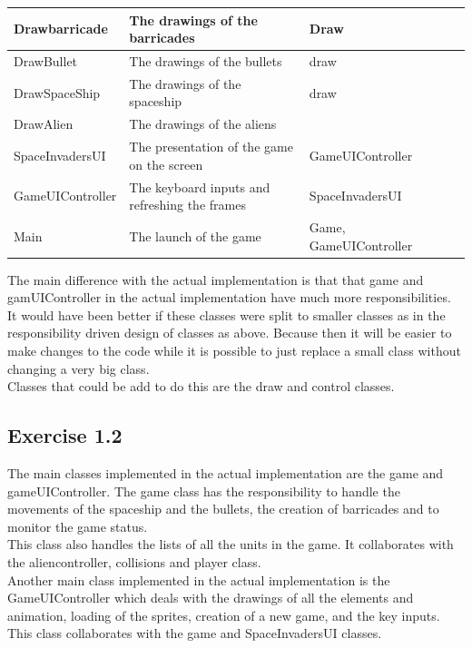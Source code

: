 \documentclass[10pt]{article}
\begin{document}
\begin{center}
\begin{tabular}{ | p{3cm} | p{5cm} | p{3cm} | p{2cm} | p{2cm} |}
  Drawbarricade & The drawings of the barricades & Draw & &  \\  \hline
  DrawBullet & The drawings of the bullets & draw & &  \\  \hline
  DrawSpaceShip & The drawings of the spaceship & draw & &  \\  \hline
  DrawAlien  & The drawings of the aliens & & &  \\  \hline
  SpaceInvadersUI & The presentation of the game on the screen & GameUIController & &  \\  \hline
  GameUIController & The keyboard inputs and refreshing the frames & SpaceInvadersUI & &  \\  \hline
  Main & The launch of the game & Game, GameUIController & &  \\  \hline
    \end{tabular}
\end{center}

The main difference with the actual implementation is that that game and gamUIController in the actual implementation have much more responsibilities.\\
It would have been better if these classes were split to smaller classes as in the responsibility driven design of classes as above. Because then it will be easier to make changes to the code while it is possible to just replace a small class without changing a very big class. \\
Classes that could be add to do this are the draw and control classes. 

 \pagebreak

 \subsection{Exercise 1.2}
The main classes implemented in the actual implementation are the game and gameUIController.
The game class has the responsibility to handle the movements of the spaceship and the bullets, the creation of barricades and to monitor the game status.\\
 This class also handles the lists of all the units in the game. It collaborates with the aliencontroller, collisions and player class. \\
Another main class implemented in the actual implementation is the GameUIController which deals with the drawings of all the elements and animation, loading of the sprites, creation of a new game,  and the key inputs.
 This class collaborates with the game and SpaceInvadersUI classes.\\
\end{document}
